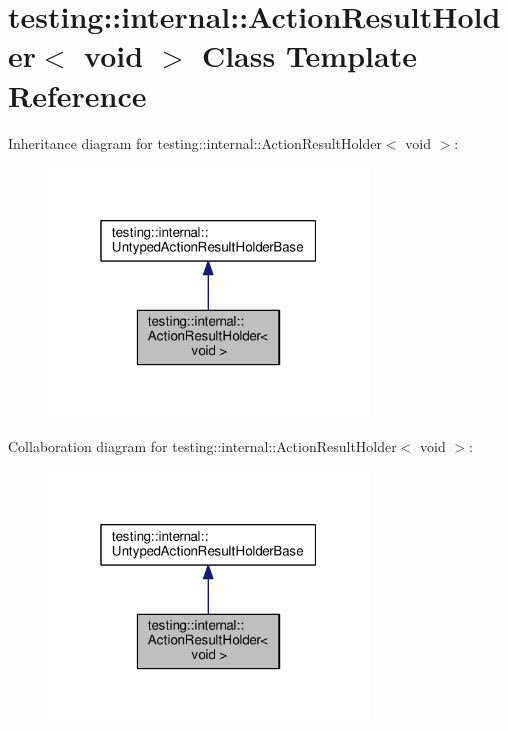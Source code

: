 \hypertarget{classtesting_1_1internal_1_1ActionResultHolder_3_01void_01_4}{}\section{testing\+:\+:internal\+:\+:Action\+Result\+Holder$<$ void $>$ Class Template Reference}
\label{classtesting_1_1internal_1_1ActionResultHolder_3_01void_01_4}


Inheritance diagram for testing\+:\+:internal\+:\+:Action\+Result\+Holder$<$ void $>$\+:\nopagebreak
\begin{figure}[H]
\begin{center}
\leavevmode
\includegraphics[width=241pt]{classtesting_1_1internal_1_1ActionResultHolder_3_01void_01_4__inherit__graph}
\end{center}
\end{figure}


Collaboration diagram for testing\+:\+:internal\+:\+:Action\+Result\+Holder$<$ void $>$\+:\nopagebreak
\begin{figure}[H]
\begin{center}
\leavevmode
\includegraphics[width=241pt]{classtesting_1_1internal_1_1ActionResultHolder_3_01void_01_4__coll__graph}
\end{center}
\end{figure}
